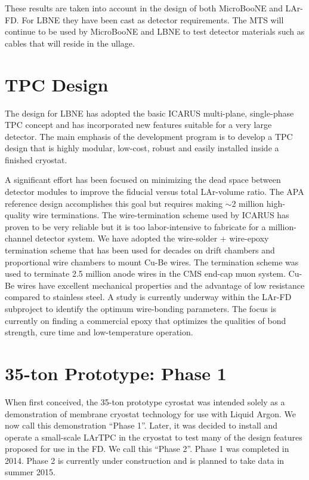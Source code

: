 These results are taken into account in the design of both MicroBooNE and LAr-FD. For LBNE they have been cast as detector requirements. The MTS will continue to be used by MicroBooNE and LBNE to test detector materials such as cables that will reside in the ullage.



\section{TPC Design}
The design for LBNE has adopted the basic ICARUS multi-plane, single-phase TPC
concept and has incorporated new features suitable for a very large
detector.  The main emphasis of the development program is to develop a TPC design that is highly modular, low-cost, robust and easily installed inside a finished cryostat.

A significant effort has been focused on minimizing the dead space between detector modules to improve
the fiducial versus total LAr-volume ratio. The APA reference design accomplishes this goal but requires making $\sim$2 million high-quality wire terminations. The wire-termination scheme used by ICARUS has proven to be very reliable but it is too labor-intensive to fabricate for a million-channel detector system. We have adopted the wire-solder + wire-epoxy termination scheme that has been used for decades on drift chambers and proportional wire chambers to mount Cu-Be wires. The termination scheme was used to terminate 2.5 million  anode wires in the CMS end-cap muon system. Cu-Be wires have excellent mechanical properties and the advantage of low resistance compared to stainless steel. A study is currently underway within the LAr-FD subproject to identify the optimum wire-bonding parameters. The focus is currently on finding a commercial epoxy that optimizes the qualities of bond strength, cure time and low-temperature operation.

\section{35-ton Prototype: Phase 1}
\label{35tonprototype}
When first conceived, the 35-ton prototype cyrostat was intended solely
as a demonstration of membrane cryostat technology for use with Liquid Argon. 
We now call this demonstration ``Phase 1''.
Later, it was decided to install and operate a small-scale LArTPC in the cryostat to test many of the design features
proposed for use in the FD. 
We call this ``Phase 2''.
Phase 1 was completed in 2014.
Phase 2 is currently under construction and is planned to take data in summer 2015.

